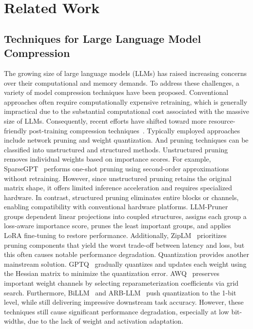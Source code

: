 \section{Related Work}
\subsection{Techniques for Large Language Model Compression}
The growing size of large language models (LLMs) has raised increasing concerns over their computational and memory demands. 
To address these challenges, a variety of model compression techniques have been proposed. 
Conventional approaches often require computationally expensive retraining, which is generally impractical due to the substantial computational cost associated with the massive size of LLMs. 
Consequently, recent efforts have shifted toward more resource-friendly post-training compression techniques~\cite{frantar2022gptq,frantar2023sparsegpt,zhu2024survey}. 
Typically employed approaches include network pruning and weight quantization. And pruning techniques can be classified into unstructured and structured methods.
Unstructured pruning removes individual weights based on importance scores. 
For example, SparseGPT~\cite{frantar2023sparsegpt} performs one-shot pruning using second-order approximations without retraining.  
However, since unstructured pruning retains the original matrix shape, it offers limited inference acceleration and requires specialized hardware. 
In contrast, structured pruning eliminates entire blocks or channels, enabling compatibility with conventional hardware platforms. 
LLM-Pruner~\cite{ma2023llm} groups dependent linear projections into coupled structures, assigns each group a loss‑aware importance score, prunes the least important groups, and applies LoRA fine‑tuning to restore performance. Additionally, ZipLM~\cite{kurtic2023ziplm} prioritizes pruning components that yield the worst trade-off between latency and loss, but this often causes notable performance degradation. 
Quantization provides another mainstream solution. 
GPTQ~\cite{frantar2022gptq} gradually quantizes and updates each weight using the Hessian matrix to minimize the quantization error. 
AWQ~\cite{lin2024awq} preserves important weight channels by selecting reparameterization coefficients via grid search. Furthermore, BiLLM~\cite{huang2024billm} and ARB-LLM~\cite{li2024arb} push quantization to the 1-bit level, while still delivering impressive downstream task accuracy. 
However, these techniques still cause significant performance degradation, especially at low bit-widths, due to the lack of weight and activation adaptation. 


